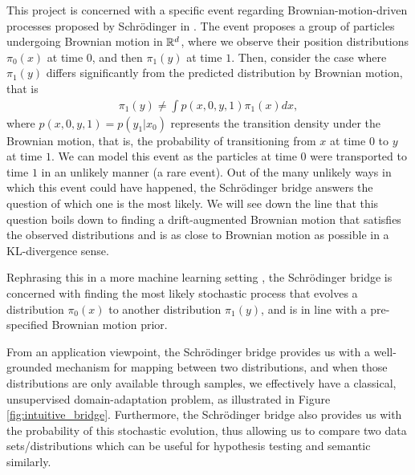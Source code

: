 \documentclass[a4paper,12pt,twoside,openright]{report}
\theoremstyle{definition}
\begin{document}
 This project is concerned with a specific event regarding Brownian-motion-driven processes proposed by Schrödinger in \citep{schrodinger1931uber, schrodinger1932theorie} . The event proposes a group of particles undergoing Brownian motion in ${\mathbb{R}}^d$, where we observe their position distributions $\pi_0(x)$ at time $0$, and then $\pi_1(y)$ at time $1$. Then, consider the case where $\pi_1(y)$ differs significantly from the predicted distribution by Brownian motion, that is
 \begin{align*}
     \pi_1(y) \neq \int p(x, 0, y , 1) \pi_1(x) dx,
 \end{align*}
 where $p(x, 0, y , 1) = p(y_1| x_0)$ represents the transition density under the Brownian motion, that is, the probability of transitioning from $x$ at time $0$ to $y$ at time $1$. We can model this event as the particles at time $0$ were transported to time $1$ in an unlikely manner (a rare event). Out of the many unlikely ways in which this event could have happened, the Schrödinger bridge answers the question of which one is the most likely. We will see down the line that this question boils down to finding a drift-augmented Brownian motion that satisfies the observed distributions and is as close to Brownian motion as possible in a KL-divergence sense.
 
 Rephrasing this in a more machine learning setting , the Schrödinger bridge is concerned with finding the most likely stochastic process that evolves a distribution $\pi_0(x)$ to another distribution $\pi_1(y)$, and is in line with a pre-specified Brownian motion prior.
 
 From an application viewpoint, the Schrödinger bridge provides us with a well-grounded mechanism for mapping between two distributions, and when those distributions are only available through samples, we effectively have a classical, unsupervised domain-adaptation problem, as illustrated in Figure \ref{fig:intuitive_bridge}. Furthermore, the Schrödinger bridge also provides us with the probability of this stochastic evolution, thus allowing us to compare two data sets/distributions which can be useful for hypothesis testing and semantic similarly.
 
\end{document}
